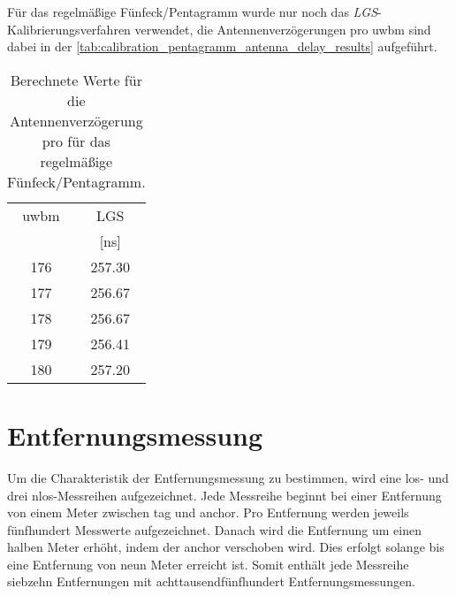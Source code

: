 Für das regelmäßige Fünfeck/Pentagramm wurde nur noch das \textit{LGS}-Ka\-li\-brie\-rungs\-ver\-fahren verwendet, die Antennenverzögerungen pro \Gls{uwbm} sind dabei in der \autoref{tab:calibration_pentagramm_antenna_delay_results} aufgeführt.

\begin{table}[h]
	\centering
	\begin{tabular}{||c||c||}
\hline
\Gls{uwbm} & LGS \\
 & [\si{\nano\second}] \\
\hline\hline
176 & \num{257.30} \\
177 & \num{256.67} \\
178 & \num{256.67} \\
179 & \num{256.41} \\
180 & \num{257.20} \\

\hline
	\end{tabular}
	\caption{Berechnete Werte für die Antennenverzögerung pro  für das regelmäßige Fünfeck/Pentagramm.}
	\label{tab:calibration_pentagramm_antenna_delay_results}
\end{table}


%

%
\section{Entfernungsmessung}

Um die Charakteristik der Entfernungsmessung zu bestimmen, wird eine \Gls{los}- und drei \Gls{nlos}-Messreihen aufgezeichnet. Jede Messreihe beginnt bei einer Entfernung von einem Meter zwischen \Gls{tag} und \Gls{anchor}. Pro Entfernung werden jeweils fünfhundert Messwerte aufgezeichnet. Danach wird die Entfernung um einen halben Meter erhöht, indem der \Gls{anchor} verschoben wird. Dies erfolgt solange bis eine Entfernung von neun Meter erreicht ist. Somit enthält jede Messreihe siebzehn Entfernungen mit achttausendfünfhundert Entfernungsmessungen.

